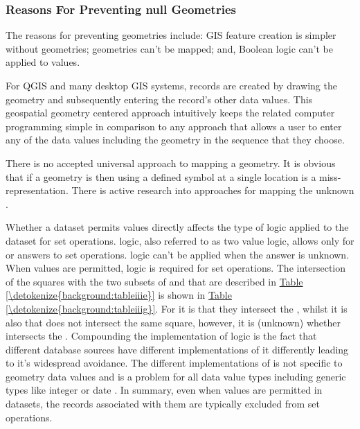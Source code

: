 \documentclass[a4paper,11pt,english]{sphinxmanual}
\begin{document}
\subsubsection{Reasons For Preventing null Geometries}
\label{\detokenize{background:reasons-for-preventing-null-geometries}}
The reasons for preventing  geometries include: GIS feature creation is simpler without  geometries;  geometries can’t be mapped; and, Boolean logic can’t be applied to  values.

For QGIS and many desktop GIS systems, records are created by drawing the geometry and subsequently entering the record’s other data values.  This geospatial geometry centered approach intuitively keeps the related computer programming simple in comparison to any approach that allows a user to enter any of the data values including the geometry in the sequence that they choose.

There is no accepted universal approach to mapping a  geometry.  It is obvious that if a geometry is  then using a defined symbol at a single location is a miss-representation.  There is active research into approaches for mapping the unknown .

Whether a dataset permits  values directly affects the type of logic applied to the dataset for set operations.   logic, also referred to as two value logic, allows only for  or  answers to set operations.   logic can’t be applied when the answer is unknown.  When  values are permitted,  logic is required for set operations.  The intersection of the squares with the two subsets of  and  that are described in \hyperref[\detokenize{background:tableiiie}]{Table \ref{\detokenize{background:tableiiie}}} is shown in \hyperref[\detokenize{background:tableiiig}]{Table \ref{\detokenize{background:tableiiig}}}.  For  it is  that they intersect the , whilst it is also  that  does not intersect the same square, however, it is  (unknown) whether  intersects the .  Compounding the implementation of  logic is the fact that different database sources have different implementations of it differently leading to it’s widespread avoidance.  The different implementations of  is not specific to geometry data values and is a problem for all data value types including generic types like integer or date .  In summary, even when  values are permitted in datasets, the records associated with them are typically excluded from set operations.
\end{document}
